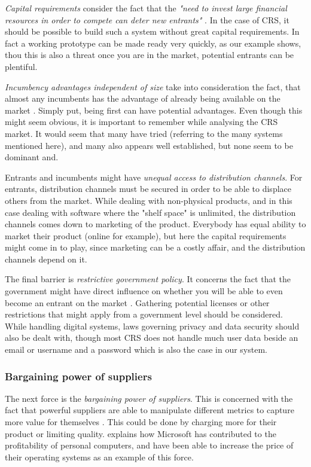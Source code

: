 \emph{Capital requirements} consider the fact that the \emph{"need to invest large financial resources in order to compete can deter new entrants"} \cite[p.~81]{porter2008five}. In the case of CRS, it should be possible to build such a system without great capital requirements. In fact a working prototype can be made ready very quickly, as our example shows, thou this is also a threat once you are in the market, potential entrants can be plentiful.

\emph{Incumbency advantages independent of size} take into consideration the fact, that almost any incumbents has the advantage of already being available on the market \cite[p.~81]{porter2008five}. Simply put, being first can have potential advantages. Even though this might seem obvious, it is important to remember while analysing the CRS market. It would seem that many have tried (referring to the many systems mentioned here), and many also appears well established, but none seem to be dominant and.

Entrants and incumbents might have \emph{unequal access to distribution channels}. For entrants, distribution channels must be secured in order to be able to displace others from the market. While dealing with non-physical products, and in this case dealing with software where the "shelf space" is unlimited, the distribution channels  comes down to marketing of the product. Everybody has equal ability to market their product (online for example), but here the capital requirements might come in to play, since marketing can be a costly affair, and the distribution channels depend on it.

The final barrier is \emph{restrictive government policy}. It concerns the fact that the government might have direct influence on whether you will be able to even become an entrant on the market \cite[p.~82]{porter2008five}. Gathering potential licenses or other restrictions that might apply from a government level should be considered. While handling digital systems, laws governing privacy and data security should also be dealt with, though most CRS does not handle much user data beside an email or username and a password which is also the case in our system.

\subsubsection{Bargaining power of suppliers}
The next force is the \emph{bargaining power of suppliers}. This is concerned with the fact that powerful suppliers are able to manipulate different metrics to capture more value for themselves \cite[p.~82]{porter2008five}. This could be done by charging more for their product or limiting quality.  explains how Microsoft has contributed to the profitability of personal computers, and have been able to increase the price of their operating systems as an example of this force.

